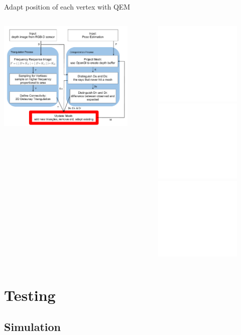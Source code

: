 \documentclass{beamer}
\begin{document}
\begin{frame}{Adapt position of each vertex with QEM}
\vspace{-.2in}
\begin{columns}
  \begin{center}
  \includegraphics[width=\textwidth]{SDupdate.pdf} 
  \end{center}
  \begin{center}
  \begin{figure}
  \includegraphics<1>[width=\textwidth]{AM1.pdf} 
  \includegraphics<2>[width=\textwidth]{AM2.pdf} 
  \includegraphics<3>[width=\textwidth]{AM3.pdf} 
  \end{figure}
  \end{center}
\end{columns}
\end{frame}

\section{Testing}
\subsection{Simulation}
\end{document}
